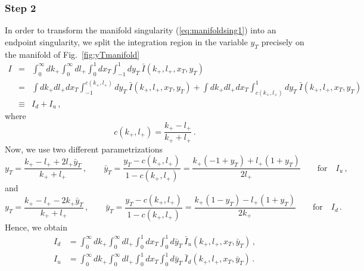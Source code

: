 \documentclass[a4paper,11pt]{article}
\newcommand{\kp}{k_+}
\newcommand{\lp}{l_+}
\numberwithin{equation}{section}
\begin{document}
\subsubsection*{Step 2}

In order to transform the manifold singularity (\ref{eq:manifoldsing1}) into
an endpoint singularity, we split the integration region in the variable $y_T$
precisely on the manifold of Fig.~\ref{fig:yTmanifold}
%
%
\begin{eqnarray}
  I & =  & 
  \int_0^\infty\!\!\! d\kp
  \int_0^\infty\!\!\! d\lp
  \int_0^1\!\!\! d x_T
  \int_{-1}^1\!\!\! d y_T\
  \bar I(\kp, \lp, x_T, y_T)
  \nonumber \\
  & = &
  \int  d\kp d\lp d x_T
  \int_{-1}^{c(\kp, \lp)}\!\!\! d y_T\
  \bar I(\kp, \lp, x_T, y_T)
  +
  \int  d\kp d\lp d x_T
  \int_{c(\kp, \lp)}^{1}\!\!\! d y_T\
  \bar I(\kp, \lp, x_T, y_T)
  \nonumber \\
  & \equiv &
  I_d + I_u\,,
\end{eqnarray}
%
where
%
\begin{equation}
  c(\kp, \lp) = \frac{\kp-\lp}{\kp+\lp}\,.
\end{equation}
%
Now, we use two different parametrizations
%
\begin{equation}
  y_T = \frac{\kp-\lp + 2 \lp \bar y_T}{\kp+\lp}\,,
  \qquad 
  \bar y_T = \frac{y_T-c(\kp,\lp)}{1-c(\kp,\lp)}
           = \frac{k_+ (-1 + y_T) + l_+ (1+ y_T)}{2 l_+}
  \qquad 
  \text{for}\quad I_u\,,
\end{equation}
%
and
%
\begin{equation}
  y_T = \frac{\kp-\lp - 2 \kp \bar y_T}{\kp+\lp}\,,
  \qquad
  \bar y_T = \frac{y_T-c(\kp,\lp)}{1-c(\kp,\lp)}
           = \frac{k_+ (1 - y_T) - l_+ (1+ y_T)}{2 k_+}
  \qquad
  \text{for}\quad I_d\,.
\end{equation}
%
Hence, we obtain
%
\begin{subequations}
  \begin{align}
    I_d  & =  
     \int_0^\infty\!\!\! d\kp
     \int_0^\infty\!\!\! d\lp
     \int_0^1\!\!\! d x_T
     \int_{0}^1\!\!\! d \bar y_T\
     \bar I_u(\kp, \lp, x_T, \bar y_T)\,,
     \\[0.5em]
    I_u  & =  
     \int_0^\infty\!\!\! d\kp
     \int_0^\infty\!\!\! d\lp
     \int_0^1\!\!\! d x_T
     \int_{0}^1\!\!\! d \bar y_T\
     \bar I_d(\kp, \lp, x_T, \bar y_T)\,.
  \end{align}
  \label{eq:IuIdstep2}
\end{subequations}
\end{document}
